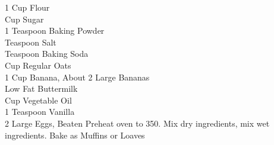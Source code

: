 {1 Cup Flour \\
  Cup Sugar \\
 1 Teaspoon Baking Powder \\
  Teaspoon Salt \\
  Teaspoon Baking Soda \\
  Cup Regular Oats \\
 1 Cup Banana, About 2 Large Bananas \\
  Low Fat Buttermilk \\
  Cup Vegetable Oil \\
 1 Teaspoon Vanilla \\
 2 Large Eggs, Beaten}
{Preheat oven to 350\degree. Mix dry ingredients, mix wet ingredients. Bake as Muffins or Loaves}
